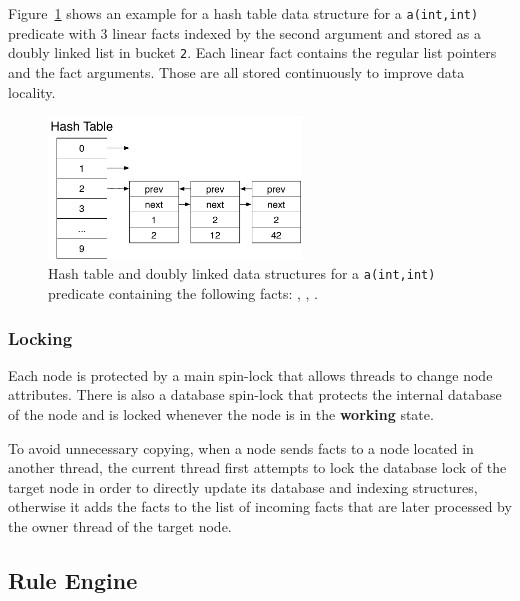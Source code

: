 Figure~\ref{fig:implementation:hash_table} shows an example for a hash table
data structure for a \texttt{a(int,int)} predicate with 3 linear facts indexed
by the second argument and stored as a doubly linked list in bucket \texttt{2}.
Each linear fact contains the regular list pointers and the fact arguments.
Those are all stored continuously to improve data locality.

\begin{figure}[ht]
\centering
\includegraphics[width=0.6\textwidth]{figures/implementation/hash_table.pdf}
\caption{Hash table and doubly linked data structures for 
   a \texttt{a(int,int)} predicate containing the following facts: , , .}
\label{fig:implementation:hash_table}
\end{figure}

\subsubsection{Locking}

Each node is protected by a main spin-lock that allows threads to change node
attributes. There is also a database spin-lock that protects the internal
database of the node and is locked whenever the node is in the \textbf{working}
state.  

To avoid unnecessary copying, when a node sends facts to a node located in
another thread, the current thread first attempts to lock the database lock of
the target node in order to directly update its database and indexing
structures, otherwise it adds the facts to the list of incoming facts that are
later processed by the owner thread of the target node.



\subsection{Rule Engine}
\label{sec:implementation:rule_engine}

